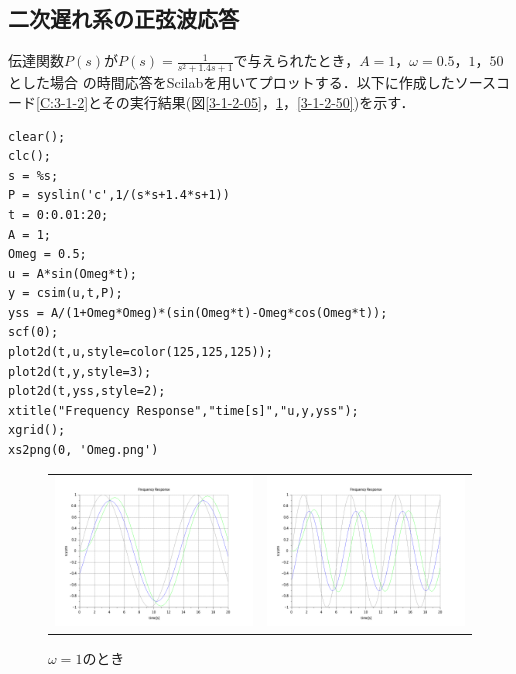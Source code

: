 \documentclass[a4paper,11pt]{jsarticle}
\begin{document}
\subsection{二次遅れ系の正弦波応答}
伝達関数$P(s)$が$P(s) = \frac{1}{s^2+1.4s+1}$で与えられたとき，$A=1$，$\omega = 0.5$，$1$，$50$とした場合
の時間応答をScilabを用いてプロットする．以下に作成したソースコード\ref{C:3-1-2}とその実行結果(図\ref{3-1-2-05}，\ref{3-1-2-1}，\ref{3-1-2-50})を示す．
\begin{lstlisting}[caption=二次遅れ系の正弦波応答, label=C:3-1-2]
clear();
clc();
s = %s;
P = syslin('c',1/(s*s+1.4*s+1))
t = 0:0.01:20;
A = 1;
Omeg = 0.5;
u = A*sin(Omeg*t);
y = csim(u,t,P);
yss = A/(1+Omeg*Omeg)*(sin(Omeg*t)-Omeg*cos(Omeg*t));
scf(0);
plot2d(t,u,style=color(125,125,125));
plot2d(t,y,style=3);
plot2d(t,yss,style=2);
xtitle("Frequency Response","time[s]","u,y,yss");
xgrid();
xs2png(0, 'Omeg.png')
    \end{lstlisting}
\begin{figure}[H]
  \begin{tabular}{cc}
    \begin{minipage}[t]{0.48\textwidth}
      \centering
      \includegraphics[clip,width=9cm]{picture/3-1-2-05.png}
      \caption{$\omega = 0.5$のとき}
      \label{3-1-2-05}
    \end{minipage} &
    \begin{minipage}[t]{0.48\textwidth}
      \centering
      \includegraphics[clip,width=9cm]{picture/3-1-2-1.png}
      \caption{$\omega = 1$のとき}
      \label{3-1-2-1}
    \end{minipage}
  \end{tabular}
\end{figure}
\end{document}
